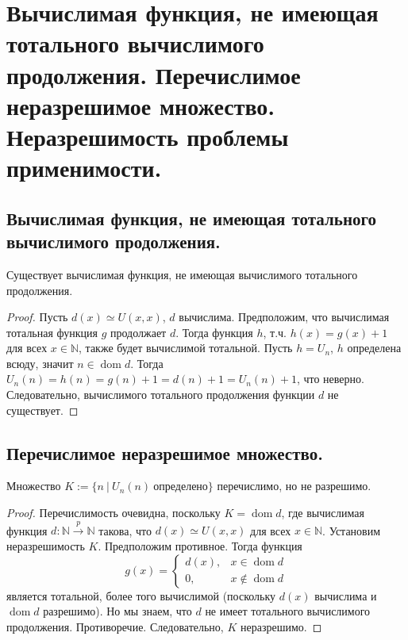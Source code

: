 \section{Вычислимая функция, не имеющая тотального вычислимого продолжения. Перечислимое неразрешимое множество. Неразрешимость проблемы применимости.}

\subsection{Вычислимая функция, не имеющая тотального вычислимого продолжения.}

\begin{statement}
  Существует вычислимая функция, не имеющая вычислимого тотального продолжения.
  \begin{proof}
    Пусть $d(x) \simeq U(x, x)$, $d$ вычислима. Предположим, что вычислимая тотальная функция $g$ продолжает $d$. Тогда функция $h$, т.ч. $h(x) = g(x) + 1$ для всех $x \in \mathbb{N}$, также будет вычислимой тотальной. Пусть $h = U_n$, $h$ определена всюду, значит $n \in \operatorname{dom} d$. Тогда $U_n(n) = h(n) = g(n) + 1 = d(n)+1 = U_n(n)+1$, что неверно. Следовательно, вычислимого тотального продолжения функции $d$ не существует.
  \end{proof}
\end{statement}

\subsection{Перечислимое неразрешимое множество.}

\begin{statement}
  Множество $K := \{n \> | \> U_n(n) \> \textit{определено} \}$ перечислимо, но не разрешимо.
  \begin{proof}
    Перечислимость очевидна, поскольку $K = \operatorname{dom} d$, где вычислимая функция $d : \mathbb{N} \overset{p}{\to} \mathbb{N}$ такова, что $d(x) \simeq U(x,x)$ для всех $x \in \mathbb{N}$. \newline
    Установим неразрешимость $K$. Предположим противное. Тогда функция
    \[
      g(x) = \begin{cases}
        d(x), & x \in \operatorname{dom} d \\
        0, & x \notin \operatorname{dom} d
      \end{cases}
    \]
    является тотальной, более того вычислимой (поскольку $d(x)$ вычислима и $\operatorname{dom} d$ разрешимо). Но мы знаем, что $d$ не имеет тотального вычислимого продолжения. Противоречие. Следовательно, $K$ неразрешимо.
  \end{proof}
\end{statement}

